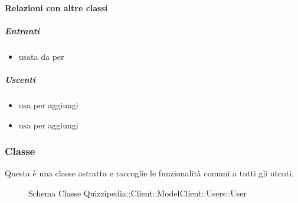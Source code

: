 \paragraph{Relazioni con altre classi}
\subparagraph{Entranti}
\begin{itemize}
\item usata da  per 
\end{itemize}
\subparagraph{Uscenti}
\begin{itemize}
\item usa  per aggiungi
\item usa  per aggiungi
\end{itemize}
\subsubsection{Classe }
Questa è una classe astratta e raccoglie le funzionalità comuni a tutti gli utenti.
\begin{figure}[H]
\centering
\noindent{}
\caption[Schema Classe User]{Schema Classe Quizzipedia::Client::ModelClient::Users::User}
\end{figure}
